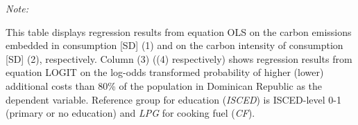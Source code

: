 \begin{table}[htbp!]
\begin{adjustbox}{width = 1\textwidth, max height = 0.95\textheight, center}
\begin{threeparttable}[b]
         \begin{tablenotes}\item \medskip \textit{Note:}
            \item This table displays regression results from equation OLS on the carbon emissions embedded in consumption [SD] (1) and on the carbon intensity of consumption [SD] (2), respectively. 
                                      Column (3) ((4) respectively) shows regression results from equation LOGIT on the log-odds transformed probability of higher (lower) additional costs than 80\% of the population in Dominican Republic as the dependent variable. Reference group for education (\textit{ISCED}) is ISCED-level 0-1 (primary or no education) and \textit{LPG} for cooking fuel (\textit{CF}).
         \end{tablenotes}
      \end{threeparttable}
   \end{adjustbox}
\end{table}


